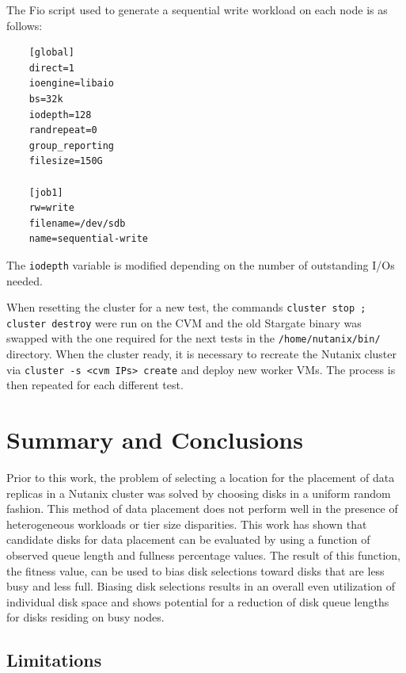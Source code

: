 \documentclass[12pt]{article}
\begin{document}
  The Fio script used to generate a sequential write workload on each node is
  as follows:
  
  \singlespace
  \begin{tcolorbox}
  \begin{verbatim}
    [global]
    direct=1
    ioengine=libaio
    bs=32k
    iodepth=128
    randrepeat=0
    group_reporting
    filesize=150G

    [job1]
    rw=write
    filename=/dev/sdb
    name=sequential-write
  \end{verbatim}
  \end{tcolorbox}
  \doublespace

  The \texttt{iodepth} variable is modified depending on the number of
  outstanding I/Os needed.

  When resetting the cluster for a new test, the commands \texttt{cluster stop
  ; cluster destroy} were run on the CVM and the old Stargate binary was
  swapped with the one required for the next tests in the
  \texttt{/home/nutanix/bin/} directory.  When the cluster ready, it is necessary to
  recreate the Nutanix cluster via \texttt{cluster -s <cvm IPs> create} and
  deploy new worker VMs. The process is then repeated for each different test.

\newpage
\null
\FloatBarrier
\section{Summary and Conclusions}

  Prior to this work, the problem of selecting a location for the placement of
  data replicas in a Nutanix cluster was solved by choosing disks in a uniform
  random fashion. This method of data placement does not perform well in the
  presence of heterogeneous workloads or tier size disparities. This work has
  shown that candidate disks for data placement can be evaluated by using a
  function of observed queue length and fullness percentage values. The result
  of this function, the fitness value, can be used to bias disk selections toward
  disks that are less busy and less full. Biasing disk selections results in
  an overall even utilization of individual disk space and shows potential for
  a reduction of disk queue lengths for disks residing on busy nodes.

  \subsection{Limitations}
\end{document}
